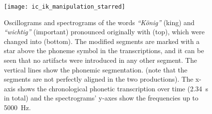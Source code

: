 %
\begin{landscape}
	\begin{figure}[t]
		\centering
		\vspace*{-2cm}
		\hspace*{-3cm}
		\texttt{[image: ic\_ik\_manipulation\_starred]}
		\caption[Oscillograms and spectrograms of categorical manipulation speech outputs]
			{Oscillograms and spectrograms of the words \emph{\enquote{König}} (king) and \emph{\enquote{wichtig}} (important) pronounced originally with \textipa{[\c{c}]} (top), which were changed into \textipa{[k]} (bottom).
			The modified segments are marked with a star above the phoneme symbol in the transcriptions, and it can be seen that no artifacts were introduced in any other segment.
			The vertical lines show the phonemic segmentation.
			(note that the segments are not perfectly aligned in the two productions).
			The x-axis shows the chronological phonetic transcription over time (\SI{2.34}{\second} in total) and the spectrograms' y-axes show the frequencies up to \SI{5000}{\hertz}.}
		\label{fig:spectrogram_ic_ik}
	\end{figure}
\end{landscape}
